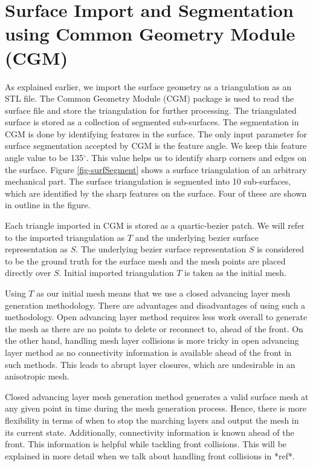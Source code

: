 \section{Surface Import and Segmentation using Common Geometry Module (CGM)}

As explained earlier, we import the surface geometry as a triangulation as an STL file. The Common Geometry Module (CGM) package is used to read the surface file and store the triangulation for further processing. The triangulated surface is stored as a collection of segmented sub-surfaces. The segmentation in CGM is done by identifying features in the surface. The only input parameter for surface segmentation accepted by CGM is the feature angle. We keep this feature angle value to be 135{$^\circ{}$}. This value helps us to identify sharp corners and edges on the surface. Figure \ref{fig-surfSegment} shows a surface triangulation of an arbitrary mechanical part. The surface triangulation is segmented into 10 sub-surfaces, which are identified by the sharp features on the surface. Four of these are shown in outline in the figure.

Each triangle imported in CGM is stored as a quartic-bezier patch. We will refer to the imported triangulation as $T$ and the underlying bezier surface representation as $S$. The underlying bezier surface representation $S$ is considered to be the ground truth for the surface mesh and the mesh points are placed directly over $S$. Initial imported triangulation $T$ is taken as the initial mesh. 

Using $T$ as our initial mesh means that we use a closed advancing layer mesh generation methodology. There are advantages and disadvantages of using such a methodology. Open advancing layer method requires less work overall to generate the mesh as there are no points to delete or reconnect to, ahead of the front. On the other hand, handling mesh layer collisions is  more tricky in open advancing layer method as no connectivity information is available ahead of the front in such methods. This leads to abrupt layer closures, which are undesirable in an anisotropic mesh.

Closed advancing layer mesh generation method generates a valid surface mesh at any given point in time during the mesh generation process. Hence, there is more flexibility in terms of when to stop the marching layers and output the mesh in its current state. Additionally, connectivity information is known ahead of the front. This information is helpful while tackling front collisions. This will be explained in more detail when we talk about handling front collisions in *ref*.

